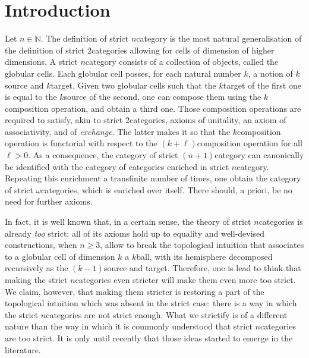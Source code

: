 \section*{Introduction}

Let \( n \in \mathbb{N} \).
The definition of strict \( n \)\nbd category is the most natural generalisation of the definition of strict \( 2 \)\nbd categories allowing for cells of dimension of higher dimensions.
A strict \( n \)\nbd category consists of a collection of objects, called the globular cells.
Each globular cell posses, for each natural number \( k \), a notion of \( k \)\nbd source and \( k \)\nbd target. 
Given two globular cells such that the \( k \)\nbd target of the first one is equal to the \( k \)\nbd source of the second, one can compose them using the \( k \)\nbd composition operation, and obtain a third one.
Those composition operations are required to satisfy, akin to strict \( 2 \)\nbd categories, axioms of unitality, an axiom of associativity, and of \emph{exchange}.
The latter makes it so that the \( k \)\nbd composition operation is functorial with respect to the \( (k + \ell) \)\nbd composition operation for all \( \ell > 0 \).
As a consequence, the category of strict \( (n + 1) \)\nbd category can canonically be identified with the category of categories enriched in strict \( n \)\nbd category. 
Repeating this enrichment a transfinite number of times, one obtain the category of strict \( \omega \)\nbd categories, which is enriched over itself.
There should, a priori, be no need for further axioms.   

In fact, it is well known that, in a certain sense, the theory of strict \( n \)\nbd categories is already \emph{too} strict: all of its axioms hold up to equality and well-devised constructions, when \( n \geq 3 \), allow to break the topological intuition that associates to a globular cell of dimension \( k \) a \( k \)\nbd ball, with its hemisphere decomposed recursively as the \( (k - 1) \)\nbd source and target.
Therefore, one is lead to think that making the strict \( n \)\nbd categories even stricter will make them even more too strict.
We claim, however, that making them stricter is restoring a part of the topological intuition which was absent in the strict case: there is a way in which the strict \( n \)\nbd categories are not strict enough.
What we strictify is of a different nature than the way in which it is commonly understood that strict \( n \)\nbd categories are too strict.
It is only until recently that those ideas started to emerge in the literature.


